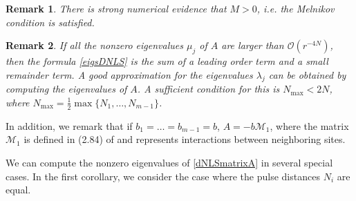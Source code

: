 \documentclass[12pt]{article}
\newtheorem{remark}{Remark}
\begin{document}
\begin{remark}
There is strong numerical evidence that $M > 0$, i.e. the Melnikov condition is satisfied.
\end{remark}

\begin{remark}
If all the nonzero eigenvalues $\mu_j$ of $A$ are larger than $\mathcal{O}(r^{-4N})$, then the formula \eqref{eigsDNLS} is the sum of a leading order term and a small remainder term. A good approximation for the eigenvalues $\lambda_j$ can be obtained by computing the eigenvalues of $A$. A sufficient condition for this is $N_{\mathrm{max}} < 2 N$, where $N_{\mathrm{max}} = \frac{1}{2} \max\{ N_1, \dots, N_{m-1}\}$.
\end{remark}

\noindent In addition, we remark that if $b_1 = \dots = b_{m-1} = b$, $A = -b \mathcal{M}_1$, where the matrix $\mathcal{M}_1$ is defined in (2.84) of \cite{Kevrekidis2009} and represents interactions between neighboring sites.

We can compute the nonzero eigenvalues of \eqref{dNLSmatrixA} in several special cases. In the first corollary, we consider the case where the pulse distances $N_i$ are equal.
\end{document}
